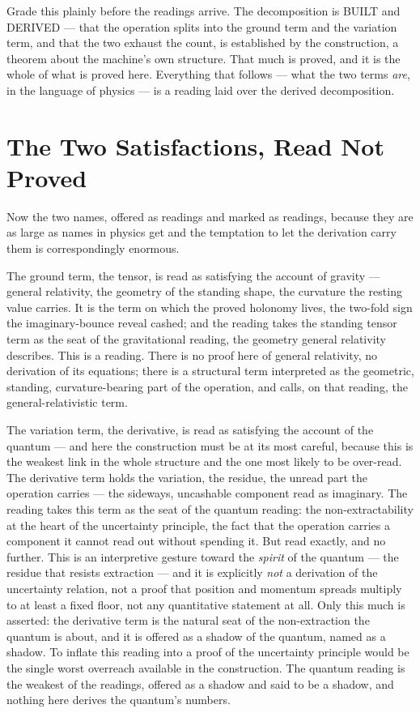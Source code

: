 Grade this plainly before the readings arrive. The decomposition is BUILT and DERIVED --- that the operation
splits into the ground term and the variation term, and that the two exhaust the count, is established by the
construction, a theorem about the machine's own structure. That much is proved, and it is the whole of what is
proved here. Everything that follows --- what the two terms \emph{are}, in the language of physics ---
is a reading laid over the derived decomposition.

\section{The Two Satisfactions, Read Not Proved}

Now the two names, offered as readings and marked as readings, because they are as large as names in physics get
and the temptation to let the derivation carry them is correspondingly enormous.

The ground term, the tensor, is read as satisfying the account of gravity --- general relativity, the
geometry of the standing shape, the curvature the resting value carries. It is the term on which the proved
holonomy lives, the two-fold sign the imaginary-bounce reveal cashed; and the reading takes the standing tensor term as the
seat of the gravitational reading, the geometry general relativity describes. This is a reading. There is no proof
here of general relativity, no derivation of its equations; there is a structural term interpreted as
the geometric, standing, curvature-bearing part of the operation, and calls, on that reading, the general-relativistic
term.

The variation term, the derivative, is read as satisfying the account of the quantum --- and here the construction
must be at its most careful, because this is the weakest link in the whole structure and the one most likely
to be over-read. The derivative term holds the variation, the residue, the unread part the operation carries ---
the sideways, uncashable component read as imaginary. The reading takes this term as the seat of the
quantum reading: the non-extractability at the heart of the uncertainty principle, the fact that the operation
carries a component it cannot read out without spending it. But read exactly, and no further. This is an
interpretive gesture toward the \emph{spirit} of the quantum --- the residue that resists extraction --- and it is
explicitly \emph{not} a derivation of the uncertainty relation, not a proof that position and momentum spreads
multiply to at least a fixed floor, not any quantitative statement at all. Only this much is asserted: the
derivative term is the natural seat of the non-extraction the quantum is about, and it is offered as a shadow of the quantum,
named as a shadow. To inflate this reading into a proof of the uncertainty principle would be the single worst
overreach available in the construction. The quantum reading is the weakest of the readings, offered as a shadow and
said to be a shadow, and nothing here derives the quantum's numbers.

